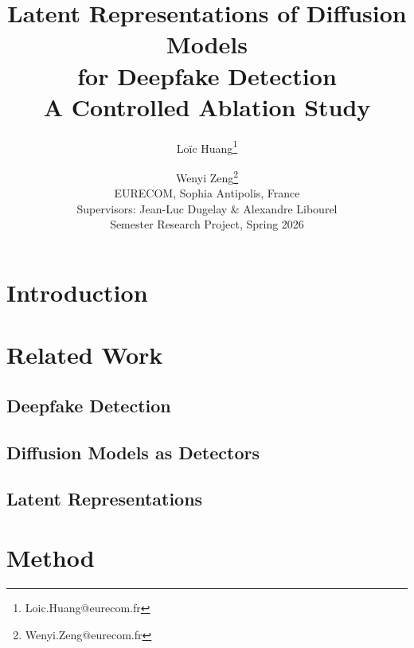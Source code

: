 \documentclass[10pt,twocolumn]{article}
\title{\textbf{Latent Representations of Diffusion Models\\for Deepfake Detection}\\
  \large A Controlled Ablation Study}
\author{
  Loïc Huang\thanks{Loic.Huang@eurecom.fr} \and
  Wenyi Zeng\thanks{Wenyi.Zeng@eurecom.fr} \\[0.3em]
  \normalsize EURECOM, Sophia Antipolis, France \\
  \normalsize Supervisors: Jean-Luc Dugelay \& Alexandre Libourel \\
  \normalsize Semester Research Project, Spring 2026
}
\date{}
\begin{document}
\maketitle

\begin{abstract}
\end{abstract}

\section{Introduction}

\section{Related Work}

\subsection{Deepfake Detection}

\subsection{Diffusion Models as Detectors}

\subsection{Latent Representations}

\section{Method}
\end{document}
